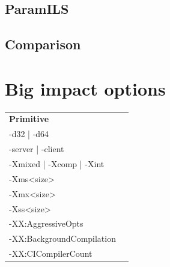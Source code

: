 \documentclass[
  digital, %
  oneside,
  notable, %
  nolof,     %
  nolot     %
]{fithesis3}
\begin{document}
\section{ParamILS}
\section{Comparison}






\appendix
\chapter{Big impact options}
\begin{table}[]
	\centering
	\begin{tabular}{ll}
	\cline{1-1}
	\multicolumn{1}{|l|}{\textbf{Primitive}}                         &                                                             \\ \cline{1-1}
	\multicolumn{1}{|l|}{-d32 | -d64}                                &                                                             \\ \cline{1-1}
	\multicolumn{1}{|l|}{-server | -client}                          &                                                             \\ \cline{1-1}
	\multicolumn{1}{|l|}{-Xmixed | -Xcomp | -Xint}                   &                                                             \\ \cline{1-1}
	\multicolumn{1}{|l|}{-Xms\textless size\textgreater}              &                                                             \\ \cline{1-1}
	\multicolumn{1}{|l|}{-Xmx\textless size\textgreater}              &                                                             \\ \cline{1-1}
	\multicolumn{1}{|l|}{-Xss\textless size\textgreater}              &                                                             \\ \cline{1-1}
	\multicolumn{1}{|l|}{-XX:AggressiveOpts}                         &                                                             \\ \cline{1-1}
	\multicolumn{1}{|l|}{-XX:BackgroundCompilation}                  &                                                             \\ \cline{1-1}
	\multicolumn{1}{|l|}{-XX:CICompilerCount}                        &                                                             \\ \cline{1-1}

\end{tabular}
\end{table}
\end{document}
